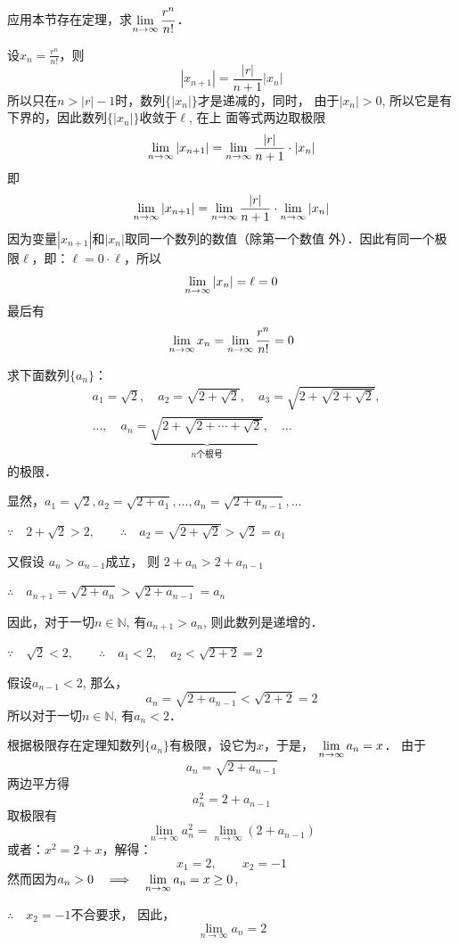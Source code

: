 \begin{example}
    应用本节存在定理，求$\displaystyle\lim_{n\to\infty}\dfrac{r^n}{n!}$．
\end{example}

\begin{solution}
    设$x_n=\frac{r^n}{n!}$，则
\[|x_{n+1}|=\frac{|r|}{n+1}|x_n|\]
所以只在$n>|r|-1$时，数列$\{|x_n|\}$才是递减的，同时，
由于$|x_n|>0$, 所以它是有下界的，因此数列$\{|x_n|\}$收敛于$\ell$, 在上
面等式两边取极限
\[\displaystyle\lim_{n\to\infty}|x_{n+1}|=\displaystyle\lim_{n\to\infty}\dfrac{|r|}{n+1}\cdot |x_n|\]
即
\[\displaystyle\lim_{n\to\infty}|x_{n+1}|=\displaystyle\lim_{n\to\infty}\dfrac{|r|}{n+1}\cdot \displaystyle\lim_{n\to\infty}|x_n|\]
因为变量$|x_{n+1}|$和$|x_n|$取同一个数列的数值（除第一个数值
外）．因此有同一个极限$\ell$，即：$\ell=0\cdot \ell$，所以
\[\displaystyle\lim_{n\to\infty}|x_n|=\ell=0\]
最后有
\[\displaystyle\lim_{n\to\infty} x_n=\displaystyle\lim_{n\to\infty} \dfrac{r^n}{n!} =0\]
\end{solution}

\begin{example}
    求下面数列$\{a_n\}$：
\[\begin{split}
   &  a_1=\sqrt{2},\quad a_2=\sqrt{2+\sqrt{2}},\quad a_3=\sqrt{2+\sqrt{2+\sqrt{2}}},\\
    & \ldots,\quad a_n=\underbrace{\sqrt{2+\sqrt{2+\cdots+\sqrt{2}}}}_{\text{$n$个根号}},\quad\ldots
\end{split} \]
的极限．
\end{example}
   
\begin{solution}
显然，$a_1=\sqrt{2}, a_2=\sqrt{2+a_1},\ldots,
a_n=\sqrt{2+a_{n-1}},\ldots$

$\because\quad 2+\sqrt{2}>2,\qquad \therefore\quad a_2=\sqrt{2+\sqrt{2}}>\sqrt{2}=a_1$

又假设
$a_n>a_{n-1}$成立，
则
$2+a_n>2+a_{n-1}$

$\therefore\quad a_{n+1}=\sqrt{2+a_n}>\sqrt{2+a_{n-1}}=a_n$

因此，对于一切$n\in\mathbb{N}$, 有$a_{n+1}>a_n$, 则此数列是递增的．

$\because\quad \sqrt{2}<2,\qquad \therefore\quad a_1<2,\quad a_2<\sqrt{2+2}=2$

假设$a_{n-1}<2$, 那么，
\[a_n=\sqrt{2+a_{n-1}}<\sqrt{2+2}=2\]
所以对于一切$n\in\mathbb{N}$, 有$a_n<2$．

根据极限存在定理知数列$\{a_n\}$有极限，设它为$x$，于是，
$\displaystyle\lim_{n\to\infty}a_n=x$．
由于
\[a_n=\sqrt{2+a_{n-1}}\]
两边平方得
\[a^2_n={2+a_{n-1}}\]
取极限有
\[\lim_{n\to\infty}a^2_n =\lim_{n\to\infty}(2+a_{n-1})\]
或者：$x^2=2+x$，解得：
\[x_1=2,\qquad x_2=-1\]
然而因为$a_n>0\quad \Longrightarrow\quad \displaystyle\lim_{n\to\infty}a_n=x\ge 0$,

$\therefore\quad x_2=-1$不合要求，
因此，
\[\lim_{n\to\infty}a_n=2\]
\end{solution}


